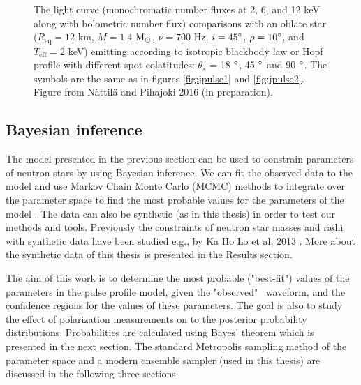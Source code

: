 \documentclass{wihuri}
\def\msun{{\rm M_{\odot}}}
\def\thetas{\theta_{s}}
\begin{document}
\begin{figure}
\centerline{}
\caption{The light curve (monochromatic number fluxes at 2, 6, and 12 keV along with bolometric number flux) comparisons with an oblate star ($R_{\mathrm{eq}} = 12$ km, $M = 1.4$ $\msun$, $\nu = 700$ Hz, $i = 45 \degree$, $\rho = 10 \degree$, and $T_{\mathrm{eff}} = 2$ keV) emitting according to isotropic blackbody law or Hopf profile with different spot colatitudes: $\thetas$ = 18 $\degree$, 45 $\degree$ and 90 $\degree$. The symbols are the same as in figures \ref{fig:jpulse1} and \ref{fig:jpulse2}. Figure from Nättilä and Pihajoki 2016 (in preparation).
\label{fig:jpulse3}}
\end{figure}




\subsection{Bayesian inference}



The model presented in the previous section can be used to constrain parameters of neutron stars by using Bayesian inference. We can fit the observed data to the model and use Markov Chain Monte Carlo (MCMC) methods to integrate over the parameter space to find the most probable values for the parameters of the model \cite{mc_methods_book}. The data can also be synthetic (as in this thesis) in order to test our methods and tools. %
Previously the constraints of neutron star masses and radii with synthetic data have been studied e.g., by Ka Ho Lo et al, 2013 \cite{miller}. %
More about the synthetic data of this thesis is presented in the Results section. 

The aim of this work is to determine the most probable ("best-fit") values of the parameters in the pulse profile model, given the "observed" \ 
waveform, and the confidence regions for the values of these parameters. The goal is also to study the effect of polarization measurements on to the posterior probability distributions. Probabilities are calculated using Bayes' theorem which is presented in the next section. The standard Metropolis sampling method of the parameter space and a modern ensemble sampler (used in this thesis) are discussed in the following three sections. 
\end{document}
